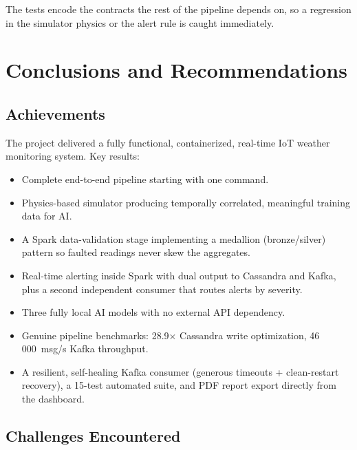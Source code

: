 \documentclass[conference,a4paper]{IEEEtran}
\begin{document}
The tests encode the contracts the rest of the pipeline depends on, so a
regression in the simulator physics or the alert rule is caught immediately.

\section{Conclusions and Recommendations}

\subsection{Achievements}

The project delivered a fully functional, containerized, real-time IoT weather monitoring system. Key results:

\begin{itemize}
  \item Complete end-to-end pipeline starting with one command.
  \item Physics-based simulator producing temporally correlated, meaningful training data for AI.
  \item A Spark data-validation stage implementing a medallion (bronze/silver) pattern so faulted readings never skew the aggregates.
  \item Real-time alerting inside Spark with dual output to Cassandra and Kafka, plus a second independent consumer that routes alerts by severity.
  \item Three fully local AI models with no external API dependency.
  \item Genuine pipeline benchmarks: 28.9$\times$ Cassandra write optimization, 46\,000~msg/s Kafka throughput.
  \item A resilient, self-healing Kafka consumer (generous timeouts + clean-restart recovery), a 15-test automated suite, and PDF report export directly from the dashboard.
\end{itemize}

\subsection{Challenges Encountered}
\end{document}
